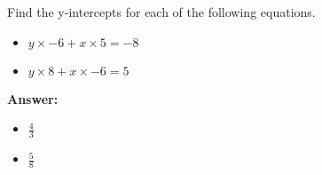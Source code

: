  Find the y-intercepts for each of the following equations. \begin{itemize}\item \( y \times -6 + x \times 5 = -8 \)\item \( y \times 8 + x \times -6 = 5 \)\end{itemize}

        \textbf{Answer:} \begin{itemize}\item \( \frac{4}{3} \)\item \( \frac{5}{8} \)\end{itemize}
